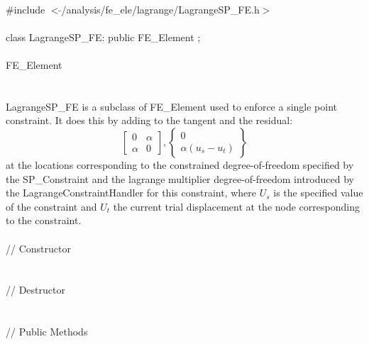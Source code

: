 
   \\
\indent \#include $<\tilde{ }$/analysis/fe\_ele/lagrange/LagrangeSP\_FE.h$>$  \\

  \\
\indent class LagrangeSP\_FE: public FE\_Element ;  \\

  \\
\indent FE\_Element \\
\indent{} \\ 

  \\
\indent LagrangeSP\_FE is a subclass of FE\_Element used to enforce a
single point constraint. It does this by adding to the tangent and the
residual:
\[ \left[ \begin{array}{cc} 0 & \alpha \\ \alpha & 0 \end{array}
\right] ,
\left\{ \begin{array}{c} 0 \\ \alpha(u_s - u_t) \end{array} \right\} \]
\noindent at the locations
corresponding to the constrained degree-of-freedom specified by the
SP\_Constraint and the lagrange multiplier degree-of-freedom
introduced by the LagrangeConstraintHandler for this constraint, where
$U_s$ is the specified value of the constraint 
and $U_t$ the current trial displacement at the node corresponding to
the constraint.\\

  \\
\indent\indent // Constructor  \\
\indent{} \\ \\
\indent\indent // Destructor  \\
\indent{}  \\ \\
\indent\indent // Public Methods \\
\indent{} \\  
\indent{} \\  
\indent{} \\  
\indent{}\\

